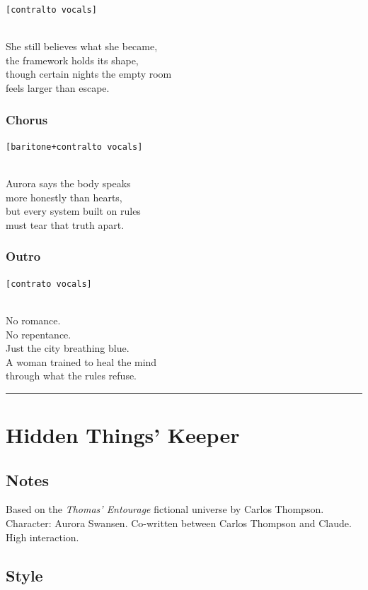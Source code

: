 \texttt{{[}contralto\ vocals{]}}\strut \\
She still believes what she became,\\
the framework holds its shape,\\
though certain nights the empty room\\
feels larger than escape.

\subsubsection{Chorus}\label{chorus-23}

\texttt{{[}baritone+contralto\ vocals{]}}\strut \\
Aurora says the body speaks\\
more honestly than hearts,\\
but every system built on rules\\
must tear that truth apart.

\subsubsection{Outro}\label{outro-1}

\texttt{{[}contrato\ vocals{]}}\strut \\
No romance.\\
No repentance.\\
Just the city breathing blue.\\
A woman trained to heal the mind\\
through what the rules refuse.

\begin{center}\rule{0.5\linewidth}{0.5pt}\end{center}

\section{Hidden Things' Keeper}\label{hidden-things-keeper}

\subsection{Notes}\label{notes-12}

Based on the \emph{Thomas' Entourage} fictional universe by Carlos
Thompson. Character: Aurora Swansen. Co-written between Carlos Thompson
and Claude. High interaction.

\subsection{Style}\label{style-11}

